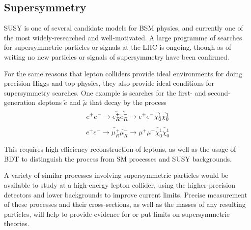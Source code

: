 \subsection{Supersymmetry}
\acrfull{SUSY} is one of several candidate models for \acrshort{BSM} physics, and currently one of the most widely-researched and well-motivated. A large programme of searches for supersymmetric particles or signals at the \acrshort{LHC} is ongoing, though as of writing no new particles or signals of supersymmetry have been confirmed.

For the same reasons that lepton colliders provide ideal environments for doing precision Higgs and top physics, they also provide ideal conditions for supersymmetry searches. One example is searches for the first- and second-generation sleptons $\tilde{e}$ and $\tilde{\mu}$ that decay by the process
$$
		e^+ e^- \rightarrow \tilde{e_R^+} \tilde{e_R^-} \rightarrow e^+ e^- \tilde{\chi_0^1} \tilde{\chi_0^1} \\
$$
$$
		e^+ e^- \rightarrow \tilde{\mu_R^+} \tilde{\mu_R^-} \rightarrow \mu^+ \mu^- \tilde{\chi_0^1} \tilde{\chi_0^1}
$$

This requires high-efficiency reconstruction of leptons, as well as the usage of \acrfull{BDT} to distinguish the process from \acrshort{SM} processes and \acrshort{SUSY} backgrounds. 

A variety of similar processes involving supersymmetric particles would be available to study at a high-energy lepton collider, using the higher-precision detectors and lower backgrounds to improve current limits. Precise measurement of these processes and their cross-sections, as well as the masses of any resulting particles, will help to provide evidence for or put limits on supersymmetric theories.

